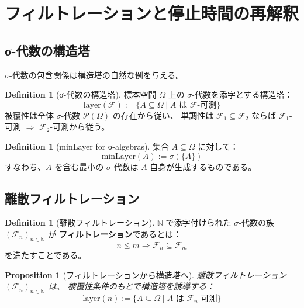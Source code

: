 \documentclass[11pt,a4paper]{article}
\theoremstyle{plain}
\newtheorem{proposition}[theorem]{Proposition}
\theoremstyle{definition}
\newtheorem{definition}[theorem]{Definition}
\newcommand{\NN}{\mathbb{N}}
\newcommand{\FF}{\mathcal{F}}
\newcommand{\minLayer}{\mathrm{minLayer}}
\newcommand{\layer}{\mathrm{layer}}
\begin{document}
\section{フィルトレーションと停止時間の再解釈}
\label{sec:filtration}

\subsection{σ-代数の構造塔}

$\sigma$-代数の包含関係は構造塔の自然な例を与える。

\begin{definition}[σ-代数の構造塔]
\label{def:sigma-tower}
標本空間 $\Omega$ 上の $\sigma$-代数を添字とする構造塔：
\[
  \layer(\FF) := \{A \subseteq \Omega \mid A \text{ は } \FF\text{-可測}\}
\]
被覆性は全体 $\sigma$-代数 $\mathcal{P}(\Omega)$ の存在から従い、
単調性は $\FF_1 \subseteq \FF_2$ ならば 
$\FF_1$-可測 $\Rightarrow$ $\FF_2$-可測から従う。
\end{definition}

\begin{definition}[minLayer for σ-algebras]
集合 $A \subseteq \Omega$ に対して：
\[
  \minLayer(A) := \sigma(\{A\})
\]
すなわち、$A$ を含む最小の $\sigma$-代数は $A$ 自身が生成するものである。
\end{definition}

\subsection{離散フィルトレーション}

\begin{definition}[離散フィルトレーション]
\label{def:filtration}
$\NN$ で添字付けられた $\sigma$-代数の族 $(\FF_n)_{n \in \NN}$ が
\textbf{フィルトレーション}であるとは：
\[
  n \leq m \Rightarrow \FF_n \subseteq \FF_m
\]
を満たすことである。
\end{definition}

\begin{proposition}[フィルトレーションから構造塔へ]
\label{prop:filtration-to-tower}
離散フィルトレーション $(\FF_n)_{n \in \NN}$ は、
被覆性条件のもとで構造塔を誘導する：
\[
  \layer(n) := \{A \subseteq \Omega \mid A \text{ は } \FF_n\text{-可測}\}
\]
\end{proposition}
\end{document}
